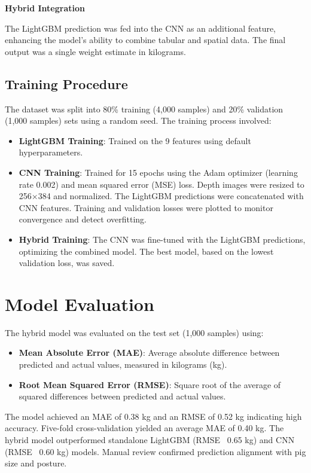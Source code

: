 {\noindent \textbf{Hybrid Integration}

The LightGBM prediction was fed into the CNN as an additional feature, enhancing the model’s ability to combine tabular and spatial data. The final output was a single weight estimate in kilograms.

\subsection{Training Procedure}

The dataset was split into 80\% training (4,000 samples) and 20\% validation (1,000 samples) sets using a random seed. The training process involved:
\begin{itemize}
	\item \textbf{LightGBM Training}: Trained on the 9 features using default hyperparameters.
	\item \textbf{CNN Training}: Trained for 15 epochs using the Adam optimizer (learning rate 0.002) and mean squared error (MSE) loss. Depth images were resized to 256$\times$384 and normalized. The LightGBM predictions were concatenated with CNN features. Training and validation losses were plotted to monitor convergence and detect overfitting.
	\item \textbf{Hybrid Training}: The CNN was fine-tuned with the LightGBM predictions, optimizing the combined model. The best model, based on the lowest validation loss, was saved.
\end{itemize}

\section{Model Evaluation} \label{Section 3.9}
The hybrid model was evaluated on the test set (1,000 samples) using:
\begin{itemize}
	\item \textbf{Mean Absolute Error (MAE)}: Average absolute difference between predicted and actual values, measured in kilograms (kg).
	\item \textbf{Root Mean Squared Error (RMSE)}: Square root of the average of squared differences between predicted and actual values.
\end{itemize}

The model achieved an MAE of 0.38 kg and an RMSE of 0.52 kg indicating high accuracy. Five-fold cross-validation yielded an average MAE of 0.40 kg. The hybrid model outperformed standalone LightGBM (RMSE ~0.65 kg) and CNN (RMSE ~0.60 kg) models. Manual review confirmed prediction alignment with pig size and posture.

}
